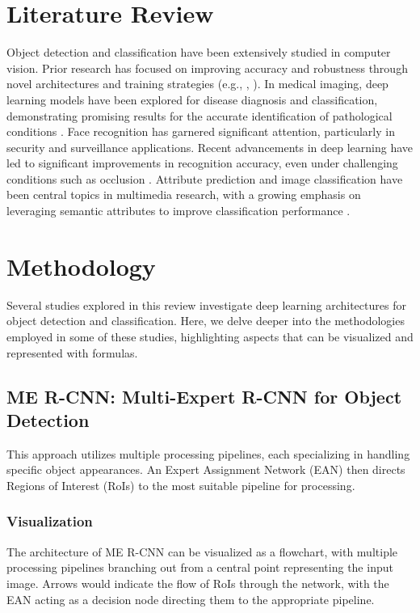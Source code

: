 \documentclass[journal]{IEEEtran}
\begin{document}
\section{Literature Review}
Object detection and classification have been extensively studied in computer vision. Prior research has focused on improving accuracy and robustness through novel architectures and training strategies (e.g., \cite{lee2020me}, \cite{tan20203d}). In medical imaging, deep learning models have been explored for disease diagnosis and classification, demonstrating promising results for the accurate identification of pathological conditions \cite{tan20203d}. Face recognition has garnered significant attention, particularly in security and surveillance applications. Recent advancements in deep learning have led to significant improvements in recognition accuracy, even under challenging conditions such as occlusion \cite{kumar2020occluded}. Attribute prediction and image classification have been central topics in multimedia research, with a growing emphasis on leveraging semantic attributes to improve classification performance \cite{abdulnabi2015multi}.

\section{Methodology}
Several studies explored in this review investigate deep learning architectures for object detection and classification. Here, we delve deeper into the methodologies employed in some of these studies, highlighting aspects that can be visualized and represented with formulas.

\subsection{ME R-CNN: Multi-Expert R-CNN for Object Detection \cite{lee2020me}}
This approach utilizes multiple processing pipelines, each specializing in handling specific object appearances. An Expert Assignment Network (EAN) then directs Regions of Interest (RoIs) to the most suitable pipeline for processing.

\subsubsection{Visualization}
The architecture of ME R-CNN can be visualized as a flowchart, with multiple processing pipelines branching out from a central point representing the input image. Arrows would indicate the flow of RoIs through the network, with the EAN acting as a decision node directing them to the appropriate pipeline.
\end{document}
